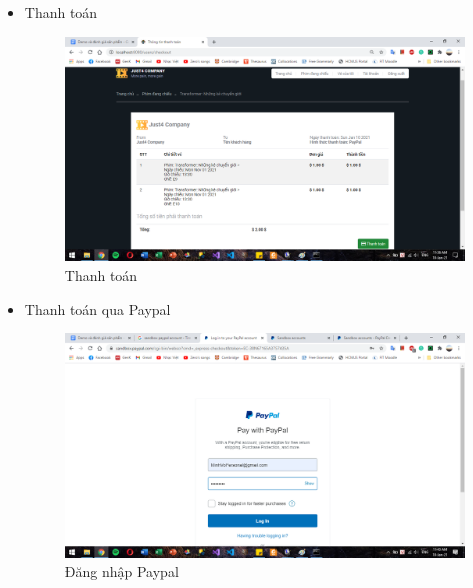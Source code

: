 \documentclass[a4paper, 12pt]{article}
\begin{document}
\begin{itemize}
	\item Thanh toán
	\begin{figure}[H]
		\begin{center}
			\includegraphics[scale=0.5]{./image/demo_checkout.png}
			\caption{Thanh toán}
		\end{center}
	\end{figure}

	\item Thanh toán qua Paypal
	\begin{figure}[H]
		\begin{center}
			\includegraphics[scale=0.5]{./image/demo_paypal1.png}
			\caption{Đăng nhập Paypal}
		\end{center}
	\end{figure}


\end{itemize}
\end{document}
